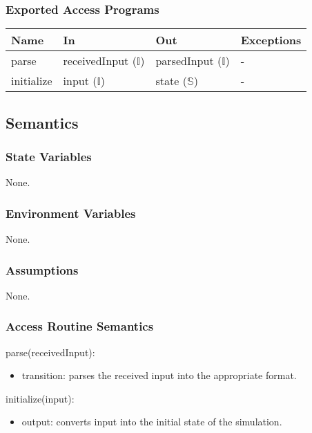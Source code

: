 \documentclass[12pt, titlepage]{article}
\begin{document}
\subsubsection{Exported Access Programs}

\begin{center}
\begin{tabular}{p{2cm} p{4cm} p{4cm} p{2cm}}
\hline
\textbf{Name} & \textbf{In} & \textbf{Out} & \textbf{Exceptions} \\
\hline
parse & receivedInput ($\mathbb{I}$) & parsedInput ($\mathbb{I}$) & - \\
initialize & input ($\mathbb{I}$) & state ($\mathbb{S}$) & - \\
\hline
\end{tabular}
\end{center}

\subsection{Semantics}

\subsubsection{State Variables}

None.

\subsubsection{Environment Variables}

None.

\subsubsection{Assumptions}

None.

\subsubsection{Access Routine Semantics}
\noindent parse(receivedInput):
\begin{itemize}
\item transition: parses the received input into the appropriate format.
\end{itemize}

\noindent initialize(input):
\begin{itemize}
\item output: converts input into the initial state of the simulation.
\end{itemize}
\end{document}

